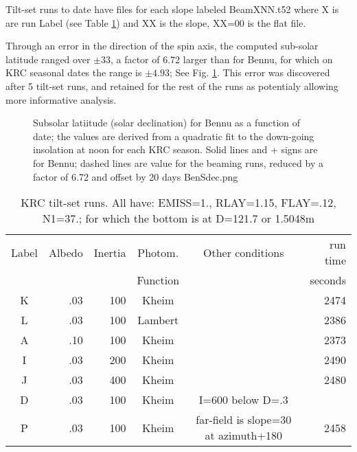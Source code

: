 \documentclass{article}
\begin{document}
Tilt-set runs to date have files for each slope labeled BeamXNN.t52 where X is
are run Label (see Table \ref{runt}) and XX is the slope, XX=00 is the flat
file.

Through an error in the direction of the spin axis, the computed sub-solar
latitude ranged over $\pm 33$\qd, a factor of 6.72 larger than for Bennu, for
which on KRC seasonal dates the range is $\pm 4.93$\qd; See
Fig. \ref{BenSdec}. This error was discovered after 5 tilt-set runs, and
retained for the rest of the runs as potentialy allowing more informative
analysis.
\begin{figure}[!ht] 
\caption[Sub-solar latitude]{Subsolar latiitude (solar declination) for Bennu as
  a function of date; the values are derived from a quadratic fit to the
  down-going insolation at noon for each KRC season.  Solid lines and + signs
  are for Bennu; dashed lines are value for the beaming runs, reduced by a
  factor of 6.72 and offset by 20 days
\label{BenSdec}  BenSdec.png  }
\end{figure} 

\begin{table} [!h]
\caption{KRC tilt-set runs. All have: EMISS=1., RLAY=1.15, FLAY=.12, N1=37.; for which the bottom is at  D=121.7 or 1.5048m }
\label{runt}
\begin{center}
\begin{tabular}{| c  r  r  c | c | r | } \hline \hline
Label & Albedo & Inertia & Photom. & Other conditions & run time\\
       &       &        & Function &  & seconds\\  \hline
K & .03 & 100 & Kheim & & 2474 \\ 
L & .03 & 100 & Lambert & & 2386 \\   %
A & .10 & 100 & Kheim & &  2373 \\ 
I & .03 & 200 & Kheim & &  2490 \\ 
J & .03 & 400 & Kheim & & 2480 \\ 
D & .03 & 100 & Kheim & I=600 below D=.3 \\
P & .03 & 100 & Kheim & far-field is slope=30 at azimuth+180 & 2458\\ 
 \hline
\end{tabular} \end{center}
\end{table}

\end{document}
